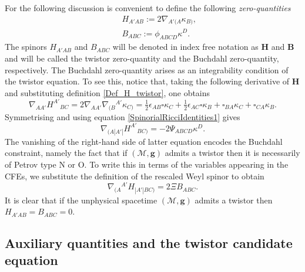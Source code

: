 \documentclass[10pt,a4paper]{article}
\theoremstyle{plain}
\def\bmg{{\bm g}}
\def\bmB{{\bm B}}
\def\bmH{{\bm H}}
\begin{document}
For the following discussion is convenient to define the following
\emph{zero-quantities}
\begin{subequations}
  \begin{eqnarray}
   && H_{A'AB} := 2
    \nabla_{A'(A}\kappa_{B)},\label{Def_H_twistor}\\ && B_{ABC}
    := \phi_{ABCD}\kappa^D.\label{Def_B_twistor}
    \end{eqnarray}
\end{subequations}
The spinors $H_{A'AB}$ and $B_{ABC}$ will be denoted in index free
notation as $\bmH$ and $\bmB$ and will be called the twistor
zero-quantity and the Buchdahl zero-quantity, respectively.  The
Buchdahl zero-quantity arises as an integrability condition of the
twistor equation.  To see this, notice that, taking the following
derivative of $\bmH$ and substituting definition
\eqref{Def_H_twistor}, one obtains
  \begin{equation}\label{curl_H_twistor}
  \nabla_{AA'}H^{A'}{}_{BC}= 2 \nabla_{AA'}\nabla_{(B}{}^{A'}\kappa
  _{C)} = \tfrac{1}{2} \epsilon _{AB} \square \kappa _{C}  +
  \tfrac{1}{2}  \epsilon _{AC} \square \kappa _{B} +
  \square_{BA}\kappa _{C} + \square_{CA}\kappa _{B}.
  \end{equation}
  Symmetrising and using equation \eqref{SpinorialRicciIdentities1} gives
  \[
  \nabla_{(A|A'|}H^{A'}{}_{BC)}= - 2\Psi_{ABCD}\kappa^D.
  \]
  The vanishing of the right-hand side of latter equation encodes the
  Buchdahl constraint, namely the fact that if $(\mathcal{M},\bmg)$
  admits a twistor then it is necessarily of Petrov type N or O. To
  write this in terms of the variables appearing in the CFEs,
  we substitute the definition of the rescaled Weyl spinor
  to obtain
  \begin{equation}\label{Curl_H_sym_toB_twistor}
  \nabla_{(A}{}^{A'}H_{|A'|BC)} = 2\Xi B_{ABC}.
  \end{equation}
  It is clear that if the unphysical spacetime
  $(\mathcal{M},\bmg)$ admits a twistor  then $H_{A'AB}=B_{ABC}=0$. 
  
\subsection{Auxiliary quantities and the twistor candidate equation}
  
\end{document}
